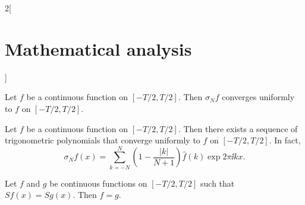 \documentclass[../../../main.tex]{subfiles}
\begin{document}
\begin{multicols}{2}[\section{Mathematical analysis}]
\begin{theorem}
  \end{theorem}
  \begin{theorem}
    Let $f$ be a continuous function on $[-T/2,T/2]$. Then $\sigma_Nf$ converges uniformly to $f$ on $[-T/2,T/2]$.
  \end{theorem}
  \begin{corollary}
    Let $f$ be a continuous function on $[-T/2,T/2]$. Then there exists a sequence of trigonometric polynomials that converge uniformly to $f$ on $[-T/2,T/2]$. In fact, $$\sigma_Nf(x)=\sum_{k=-N}^N\left(1-\frac{|k|}{N+1}\right)\widehat{f}(k)\exp{2\pi\ii kx}.$$
  \end{corollary}
  \begin{corollary}
    Let $f$ and $g$ be continuous functions on $[-T/2,T/2]$ such that $Sf(x)=Sg(x)$. Then $f=g$.
  \end{corollary}

\end{multicols}
\end{document}
